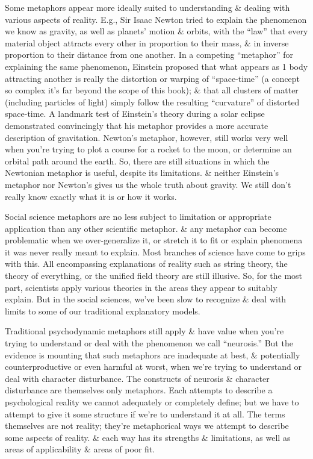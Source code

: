 \documentclass{article}
\numberwithin{equation}{section}
\begin{document}
Some metaphors appear more ideally suited to understanding \& dealing with various aspects of reality. E.g., Sir Isaac Newton tried to explain the phenomenon we know as gravity, as well as planets' motion \& orbits, with the ``law'' that every material object attracts every other in proportion to their mass, \& in inverse proportion to their distance from one another. In a competing ``metaphor'' for explaining the same phenomenon, Einstein proposed that what appears as 1 body attracting another is really the distortion or warping of ``space-time'' (a concept so complex it's far beyond the scope of this book); \& that all clusters of matter (including particles of light) simply follow the resulting ``curvature'' of distorted space-time. A landmark test of Einstein's theory during a solar eclipse demonstrated convincingly that his metaphor provides a more accurate description of gravitation. Newton's metaphor, however, still works very well when you're trying to plot a course for a rocket to the moon, or determine an orbital path around the earth. So, there are still situations in which the Newtonian metaphor is useful, despite its limitations. \& neither Einstein's metaphor nor Newton's gives us the whole truth about gravity. We still don't really know exactly what it is or how it works.

Social science metaphors are no less subject to limitation or appropriate application than any other scientific metaphor. \& any metaphor can become problematic when we over-generalize it, or stretch it to fit or explain phenomena it was never really meant to explain. Most branches of science have come to grips with this. All encompassing explanations of reality such as string theory, the theory of everything, or the unified field theory are still illusive. So, for the most part, scientists apply various theories in the areas they appear to suitably explain. But in the social sciences, we've been slow to recognize \& deal with limits to some of our traditional explanatory models.

Traditional psychodynamic metaphors still apply \& have value when you're trying to understand or deal with the phenomenon we call ``neurosis.'' But the evidence is mounting that such metaphors are inadequate at best, \& potentially counterproductive or even harmful at worst, when we're trying to understand or deal with character disturbance. The constructs of neurosis \& character disturbance are themselves only metaphors. Each attempts to describe a psychological reality we cannot adequately or completely define; but we have to attempt to give it some structure if we're to understand it at all. The terms themselves are not reality; they're metaphorical ways we attempt to describe some aspects of reality. \& each way has its strengths \& limitations, as well as areas of applicability \& areas of poor fit.
\end{document}
